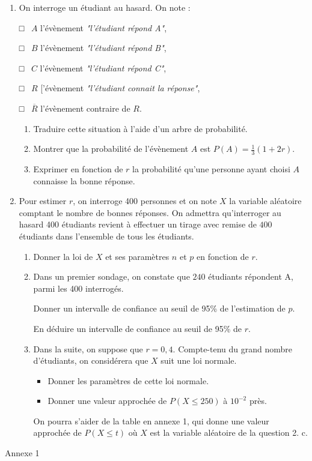 \begin{enumerate}
     \item
     On interroge un étudiant au hasard. On note :
     \par
     □  $A$ l'évènement \textit{"l'étudiant répond A"},
     \par
     □  $B$ l'évènement \textit{"l'étudiant répond B"},
     \par
     □  $C$ l'évènement \textit{"l'étudiant répond C"},
     \par
     □  $R$ ['évènement \textit{"l'étudiant connait la réponse"},
     \par
     □  $\overline{R}$ l'évènement contraire de $R$.
     \begin{enumerate}[label=\alph*.]
          \item
          Traduire cette situation à l'aide d'un arbre de probabilité.
          \item
          Montrer que la probabilité de l'évènement $A$ est $P\left(A\right)=\frac{1}{3}\left(1+2r\right)$.
          \item
     Exprimer en fonction de $r$ la probabilité qu'une personne ayant choisi $A$ connaisse  la bonne réponse.\end{enumerate}
     \item
     Pour estimer $r$, on interroge 400 personnes et on note $X$ la variable aléatoire comptant le nombre de bonnes réponses. On admettra qu'interroger au hasard 400 étudiants revient à effectuer un tirage avec remise de $400$ étudiants dans l'ensemble de tous les étudiants.
     \begin{enumerate}
          \item
          Donner la loi de $X$ et ses paramètres $n$ et $p$ en fonction de $r$.
          \item
          Dans un premier sondage, on constate que $240$ étudiants répondent A, parmi les 400 interrogés.
          \par
          Donner un intervalle de confiance au seuil de 95\% de l'estimation de $p$.
          \par
          En déduire un intervalle de confiance au seuil de 95\% de $r$.
          \item
          Dans la suite, on suppose que $r=0,4$. Compte-tenu du grand nombre d'étudiants, on considérera que $X$ suit une loi normale.
          \begin{itemize}
               \item
               Donner les paramètres de cette loi normale.
               \item
               Donner une valeur approchée de $P\left(X\leqslant 250\right)$ à $10^{- 2}$ près.
          \end{itemize}
     On pourra s'aider de la table en annexe 1, qui donne une valeur approchée de $P\left(X\leqslant t\right)$ où $X$ est la variable aléatoire de la question 2. c.\end{enumerate}
\end{enumerate}
\begin{h3}Annexe 1\end{h3}

